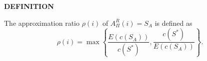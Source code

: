 \begin{notesdefinition}
\textbf{DEFINITION}

The approximation ratio $\rho(i)$ of $A^R_\Pi(i)=S_A$ is defined as
\[\rho(i)=\max\left\{\frac{E(c(S_A))}{c(S^*)},\frac{c(S^*)}{E(c(S_A))}\right\}.\]
\end{notesdefinition}
